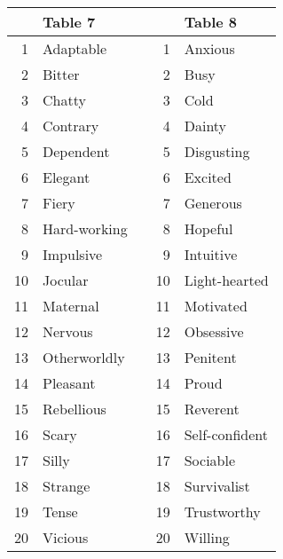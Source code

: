 \documentclass[12pt]{article}
\begin{document}
\begin{tabular}{r|l l r|l}
 & Table 7 & & & Table 8 \\\hline
 1 & Adaptable & &  1 & Anxious\\
 2 & Bitter & &  2 & Busy\\
 3 & Chatty & &  3 & Cold\\
 4 & Contrary & &  4 & Dainty\\
 5 & Dependent & &  5 & Disgusting\\
 6 & Elegant & &  6 & Excited\\
 7 & Fiery & &  7 & Generous\\
 8 & Hard-working & &  8 & Hopeful                           \\
 9 & Impulsive & &  9 & Intuitive\\
10 & Jocular & & 10 & Light-hearted\\
11 & Maternal & & 11 & Motivated\\
12 & Nervous & & 12 & Obsessive\\
13 & Otherworldly & & 13 & Penitent\\
14 & Pleasant & & 14 & Proud\\
15 & Rebellious & & 15 & Reverent\\
16 & Scary & & 16 & Self-confident\\
17 & Silly & & 17 & Sociable\\
18 & Strange & & 18 & Survivalist\\
19 & Tense & & 19 & Trustworthy\\
20 & Vicious & & 20 & Willing\\
\end{tabular}
\end{document}
